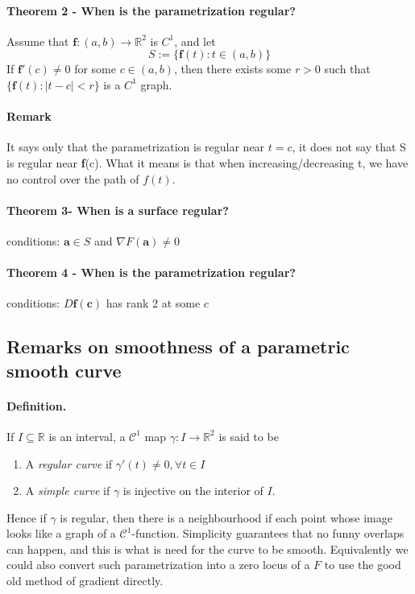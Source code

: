 \documentclass[11pt]{article}
\newcommand{\tb}[1]{\textbf{#1}}
\newcommand{\real}[0]{\mathbb{R}}
\newcommand{\func}[3]{\tb{#1}: {#2} \rightarrow {#3} }
\begin{document}
\paragraph{Theorem 2 - When is the parametrization regular?} 
Assume that $\func{f}{(a, b)}{\real ^2}$ is $C^1$, and let
$$S:=\{ \tb{f}(t): t \in (a, b)\}$$
If $\tb{f}'(c) \neq 0$ for some $c \in (a, b)$, then there exists some $r>0$ such that $\{ \tb{f} (t): |t-c| < r\}$ is a $C^1$ graph. \newline
\paragraph{Remark}
It says only that the parametrization is regular near $t = c$, it does not say that S is regular near \tb{f}(c). What it means is that when increasing/decreasing t, we have no control over the path of $f(t)$.
\paragraph{Theorem 3- When is a surface regular?}
conditions: $\tb{a} \in S$ and $\nabla F(\tb{a}) \neq 0$
\paragraph{Theorem 4 - When is the parametrization regular?}
conditions: $D\tb{f}(\tb{c})$ has rank 2 at some $c$

\subsection{Remarks on smoothness of a parametric smooth curve} 
\paragraph{Definition.}If $I\subseteq \real$ is an interval, a $\mathcal{C}^1$ map $\gamma: I \rightarrow{} \real^2$ is said to be
\begin{enumerate}
    \item A \textit{regular curve} if $\gamma'(t)\neq 0, \forall t\in I$
    \item A \textit{simple curve} if $\gamma$ is injective on the interior of $I$.
\end{enumerate}
Hence if $\gamma$ is regular, then there is a neighbourhood if each point whose image looks like a graph of a $\mathcal{C}^1$-function. Simplicity guarantees that no funny overlaps can happen, and this is what is need for the curve to be smooth. Equivalently we could also convert such parametrization into a zero locus of a $F$ to use the good old method of gradient directly.
\end{document}
